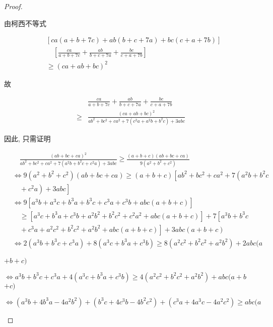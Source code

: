 \begin{proof}
\begin{example}
\begin{note}
	由柯西不等式
	
	$$
	\begin{aligned}
	& {[c a(a+b+7 c)+a b(b+c+7 a)+b c(c+a+7 b)]} \\
	& \quad\left[\frac{c a}{a+b+7 c}+\frac{a b}{b+c+7 a}+\frac{b c}{c+a+7 b}\right] \\
	& \geqslant(c a+a b+b c)^{2}
	\end{aligned}
	$$
	
	故
	
	$$
	\begin{aligned}
	& \frac{c a}{a+b+7 c}+\frac{a b}{b+c+7 a}+\frac{b c}{c+a+7 b} \\
	\geqslant & \frac{(c a+a b+b c)^{2}}{a b^{2}+b c^{2}+c a^{2}+7\left(c^{2} a+a^{2} b+b^{2} c\right)+3 a b c}
	\end{aligned}
	$$
	
	因此, 只需证明
	
	$$
	\begin{aligned}
	& \quad \frac{(a b+b c+c a)^{2}}{a b^{2}+b c^{2}+c a^{2}+7\left(a^{2} b+b^{2} c+c^{2} a\right)+3 a b c} \geqslant \frac{(a+b+c)(a b+b c+c a)}{9\left(a^{2}+b^{2}+c^{2}\right)} \\
	& \Leftrightarrow 9\left(a^{2}+b^{2}+c^{2}\right)(a b+b c+c a) \geqslant(a+b+c)\left[a b^{2}+b c^{2}+c a^{2}+7\left(a^{2} b+b^{2} c\right.\right. \\
	& \left.\left.\quad+c^{2} a\right)+3 a b c\right] \\
	& \Leftrightarrow 9\left[a^{3} b+a^{3} c+b^{3} a+b^{3} c+c^{3} a+c^{3} b+a b c(a+b+c)\right] \\
	& \quad \geqslant\left[a^{3} c+b^{3} a+c^{3} b+a^{2} b^{2}+b^{2} c^{2}+c^{2} a^{2}+a b c(a+b+c)\right]+7\left[a^{3} b+b^{3} c\right. \\
	& \left.\quad+c^{3} a+a^{2} c^{2}+b^{2} c^{2}+a^{2} b^{2}+a b c(a+b+c)\right]+3 a b c(a+b+c) \\
	& \Leftrightarrow 2\left(a^{3} b+b^{3} c+c^{3} a\right)+8\left(a^{3} c+b^{3} a+c^{3} b\right) \geqslant 8\left(a^{2} c^{2}+b^{2} c^{2}+a^{2} b^{2}\right)+2 a b c(a
	\end{aligned}
	$$
	
	$+b+c)$
	
	$\Leftrightarrow a^{3} b+b^{3} c+c^{3} a+4\left(a^{3} c+b^{3} a+c^{3} b\right) \geqslant 4\left(a^{2} c^{2}+b^{2} c^{2}+a^{2} b^{2}\right)+a b c(a+b$ $+c)$
	
	$\Leftrightarrow\left(a^{3} b+4 b^{3} a-4 a^{2} b^{2}\right)+\left(b^{3} c+4 c^{3} b-4 b^{2} c^{2}\right)+\left(c^{3} a+4 a^{3} c-4 a^{2} c^{2}\right) \geqslant a b c(a$
	

\end{note}
\end{example}
\end{proof}

